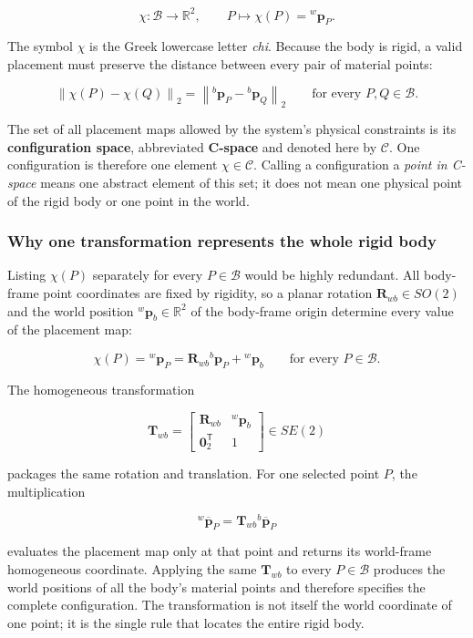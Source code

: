 \documentclass[
  australian,
  12pt,
  letterpaper,
  DIV=11,
  numbers=noendperiod,
  twoside]{scrreprt}
\begin{document}
\[
\chi:\mathcal B\rightarrow\mathbb R^2,
\qquad
P\longmapsto\chi(P)={}^{w}\mathbf p_P.
\]

The symbol \(\chi\) is the Greek lowercase letter \emph{chi}. Because
the body is rigid, a valid placement must preserve the distance between
every pair of material points:

\[
\left\|\chi(P)-\chi(Q)\right\|_2
=
\left\|{}^{b}\mathbf p_P-{}^{b}\mathbf p_Q\right\|_2
\qquad
\text{for every }P,Q\in\mathcal B.
\]

The set of all placement maps allowed by the system's physical
constraints is its \textbf{configuration space}, abbreviated
\textbf{C-space} and denoted here by \(\mathcal C\). One configuration
is therefore one element \(\chi\in\mathcal C\). Calling a configuration
a \emph{point in C-space} means one abstract element of this set; it
does not mean one physical point of the rigid body or one point in the
world.

\subsubsection{Why one transformation represents the whole rigid
body}\label{why-one-transformation-represents-the-whole-rigid-body}

Listing \(\chi(P)\) separately for every \(P\in\mathcal B\) would be
highly redundant. All body-frame point coordinates are fixed by
rigidity, so a planar rotation \(\mathbf R_{wb}\in SO(2)\) and the world
position \({}^{w}\mathbf p_b\in\mathbb R^2\) of the body-frame origin
determine every value of the placement map:

\[
\boxed{
\chi(P)
=
{}^{w}\mathbf p_P
=
\mathbf R_{wb}{}^{b}\mathbf p_P
+
{}^{w}\mathbf p_b
\qquad
\text{for every }P\in\mathcal B
}.
\]

The homogeneous transformation

\[
\mathbf T_{wb}
=
\begin{bmatrix}
\mathbf R_{wb}&{}^{w}\mathbf p_b\\
\mathbf 0_2^\mathsf T&1
\end{bmatrix}
\in SE(2)
\]

packages the same rotation and translation. For one selected point
\(P\), the multiplication

\[
{}^{w}\overline{\mathbf p}_P
=
\mathbf T_{wb}{}^{b}\overline{\mathbf p}_P
\]

evaluates the placement map only at that point and returns its
world-frame homogeneous coordinate. Applying the same \(\mathbf T_{wb}\)
to every \(P\in\mathcal B\) produces the world positions of all the
body's material points and therefore specifies the complete
configuration. The transformation is not itself the world coordinate of
one point; it is the single rule that locates the entire rigid body.
\end{document}
